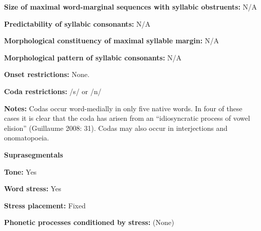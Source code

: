 \begin{styleBody}
\textbf{Size of maximal word{}-marginal sequences with syllabic obstruents:} N/A
\end{styleBody}

\begin{styleBody}
\textbf{Predictability of syllabic consonants:} N/A
\end{styleBody}

\begin{styleBody}
\textbf{Morphological constituency of maximal syllable margin:} N/A
\end{styleBody}

\begin{styleBody}
\textbf{Morphological pattern of syllabic consonants:} N/A
\end{styleBody}

\begin{styleBody}
\textbf{Onset restrictions:} None.
\end{styleBody}

\begin{styleBody}
\textbf{Coda restrictions:} /s/ or /n/
\end{styleBody}

\begin{styleBody}
\textbf{Notes:} Codas occur word-medially in only five native words. In four of these cases it is clear that the coda has arisen from an “idiosyncratic process of vowel elision” (Guillaume 2008: 31). Codas may also occur in interjections and onomatopoeia.
\end{styleBody}

\begin{styleBody}
\textbf{Suprasegmentals}
\end{styleBody}

\begin{styleBody}
\textbf{Tone:} Yes
\end{styleBody}

\begin{styleBody}
\textbf{Word stress: }Yes
\end{styleBody}

\begin{styleBody}
\textbf{Stress placement:} Fixed
\end{styleBody}

\begin{styleBody}
\textbf{Phonetic processes conditioned by stress:} (None)
\end{styleBody}

